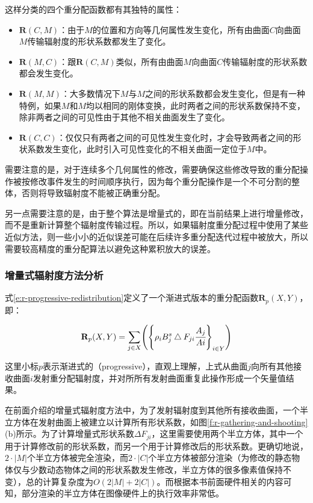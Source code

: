 \noindent 这样分类的四个重分配函数都有其独特的属性：

\begin{itemize}
	\item $\mathbf{R}(C,M)$：由于$M$的位置和方向等几何属性发生变化，所有由曲面$C$向曲面$M$传输辐射度的形状系数都发生了变化。
	\item $\mathbf{R}(M,C)$：跟$\mathbf{R}(C,M)$类似，所有由曲面$M$向曲面$C$传输辐射度的形状系数都会发生变化。 
	\item $\mathbf{R}(M,M)$：大多数情况下$M$与$M$之间的形状系数都会发生变化，但是有一种特例，如果$M$和$M$均以相同的刚体变换，此时两者之间的形状系数保持不变，除非两者之间的可见性由于其他不相关曲面发生了变化。
	\item $\mathbf{R}(C,C)$：仅仅只有两者之间的可见性发生变化时，才会导致两者之间的形状系数发生变化，此时引入可见性变化的不相关曲面一定位于$M$中。
\end{itemize}

需要注意的是，对于连续多个几何属性的修改，需要确保这些修改导致的重分配操作被按修改事件发生的时间顺序执行，因为每个重分配操作是一个不可分割的整体，否则将导致辐射度不能被正确重分配。

另一点需要注意的是，由于整个算法是增量式的，即在当前结果上进行增量修改，而不是重新计算整个辐射度传输过程。所以，如果辐射度重分配过程中使用了某些近似方法，则一些小小的近似误差可能在后续许多重分配迭代过程中被放大，所以需要较高精度的重分配算法以避免这种累积放大的误差。




\subsubsection{增量式辐射度方法分析}
式\ref{e:r-progressive-redistribution}定义了一个渐进式版本的重分配函数$\mathbf{R}_p(X,Y)$，即：

\begin{equation}\label{e:r-progressive-redistribution}
	\mathbf{R}_p(X,Y)=\sum_{j\in X}\Biggr(\Biggr\{ \rho_i B^{s}_j \bigtriangleup F_{ji} \cfrac{A_j}{Ai} \Biggr\}_{i\in Y}\Biggr)
\end{equation}

\noindent 这里小标$p$表示渐进式的（progressive），直观上理解，上式从曲面$j$向所有其他接收曲面$i$发射重分配辐射度，并对所所有发射曲面重复此操作形成一个矢量值结果。

在前面介绍的增量式辐射度方法中，为了发射辐射度到其他所有接收曲面，一个半立方体在发射曲面上被建立以计算所有形状系数，如图\ref{f:r-gathering-and-shooting}(b)所示。为了计算增量式形状系数$\Delta F_{ji}$，这里需要使用两个半立方体，其中一个用于计算修改前的形状系数，而另一个用于计算修改后的形状系数。更确切地说，$2\cdot|M|$个半立方体被完全渲染，而$2\cdot |C|$个半立方体被部分渲染（为修改的静态物体仅与少数动态物体之间的形状系数发生修改，半立方体的很多像素值保持不变），总的计算复杂度为$O(2|M|+2|C|)$。而根据本书前面硬件相关的内容可知，部分渲染的半立方体在图像硬件上的执行效率非常低。

